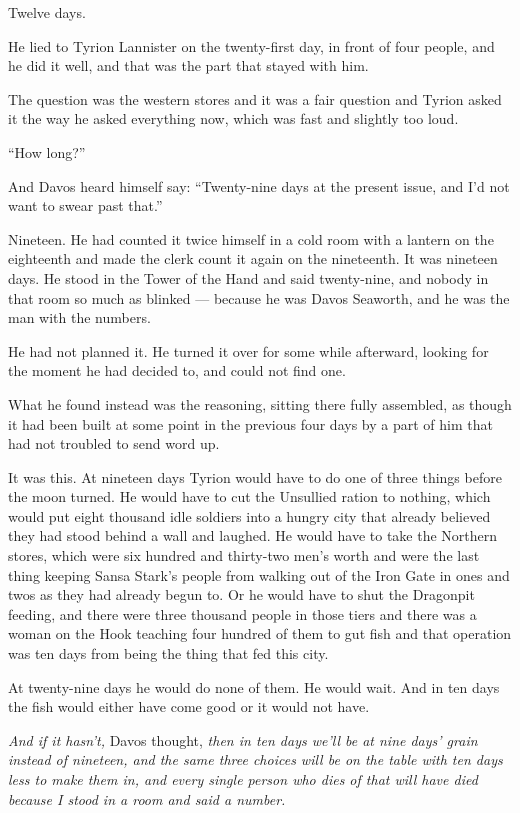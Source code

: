 Twelve days.

\sceneBreak

He lied to Tyrion Lannister on the twenty-first day, in front of four people, and he did it well, and that was the part that stayed with him.

The question was the western stores and it was a fair question and Tyrion asked it the way he asked everything now, which was fast and slightly too loud.

“How long?”

And Davos heard himself say: “Twenty-nine days at the present issue, and I’d not want to swear past that.”

Nineteen. He had counted it twice himself in a cold room with a lantern on the eighteenth and made the clerk count it again on the nineteenth. It was nineteen days. He stood in the Tower of the Hand and said twenty-nine, and nobody in that room so much as blinked — because he was Davos Seaworth, and he was the man with the numbers.

He had not planned it. He turned it over for some while afterward, looking for the moment he had decided to, and could not find one.

What he found instead was the reasoning, sitting there fully assembled, as though it had been built at some point in the previous four days by a part of him that had not troubled to send word up.

It was this. At nineteen days Tyrion would have to do one of three things before the moon turned. He would have to cut the Unsullied ration to nothing, which would put eight thousand idle soldiers into a hungry city that already believed they had stood behind a wall and laughed. He would have to take the Northern stores, which were six hundred and thirty-two men’s worth and were the last thing keeping Sansa Stark’s people from walking out of the Iron Gate in ones and twos as they had already begun to. Or he would have to shut the Dragonpit feeding, and there were three thousand people in those tiers and there was a woman on the Hook teaching four hundred of them to gut fish and that operation was ten days from being the thing that fed this city.

At twenty-nine days he would do none of them. He would wait. And in ten days the fish would either have come good or it would not have.

\textit{And if it hasn’t,} Davos thought, \textit{then in ten days we’ll be at nine days’ grain instead of nineteen, and the same three choices will be on the table with ten days less to make them in, and every single person who dies of that will have died because I stood in a room and said a number.}

